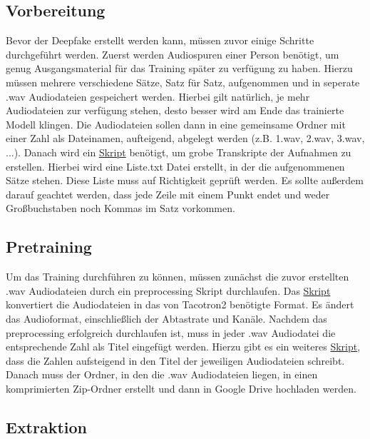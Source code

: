 \subsection{Vorbereitung}
Bevor der Deepfake erstellt werden kann, müssen zuvor einige Schritte durchgeführt werden. Zuerst werden Audiospuren einer Person benötigt, um genug Ausgangsmaterial für das Training später zu verfügung zu haben. Hierzu müssen mehrere verschiedene Sätze, Satz für Satz, aufgenommen und in seperate .wav Audiodateien gespeichert werden. Hierbei gilt natürlich, je mehr Audiodateien zur verfügung stehen, desto besser wird am Ende das trainierte Modell klingen. Die Audiodateien sollen dann in eine gemeinsame Ordner mit einer Zahl als Dateinamen, aufteigend, abgelegt werden (z.B. 1.wav, 2.wav, 3.wav, ...).\newline
Danach wird ein \href{https://github.com/rasmurtech/Tacotron2-Wav2Vec-Transcription/blob/main/transcribe_wav2vec.py}{Skript} benötigt, um grobe Transkripte der Aufnahmen zu erstellen. Hierbei wird eine Liste.txt Datei erstellt, in der die aufgenommenen Sätze stehen. Diese Liste muss auf Richtigkeit geprüft werden. Es sollte außerdem darauf geachtet werden, dass jede Zeile mit einem Punkt endet und weder Großbuchstaben noch Kommas im Satz vorkommen.\newline
\subsection{Pretraining}
Um das Training durchführen zu können, müssen zunächst die zuvor erstellten .wav Audiodateien durch ein preprocessing Skript durchlaufen. Das \href{https://github.com/rasmurtech/Tacotron-2-Audio-Preprocessor/blob/main/tacotron2_preprocessor_wav_files.py}{Skript} konvertiert die Audiodateien in das von Tacotron2 benötigte Format. Es ändert das Audioformat, einschließlich der Abtastrate und Kanäle.\newline
Nachdem das preprocessing erfolgreich durchlaufen ist, muss in jeder .wav Audiodatei die entsprechende Zahl als Titel eingefügt werden. Hierzu gibt es ein weiteres \href{https://github.com/rasmurtech/Audio-Metadata-Updater/blob/main/audio_metadata_updater.py}{Skript}, dass die Zahlen aufsteigend in den Titel der jeweiligen Audiodateien schreibt.\newline
Danach muss der Ordner, in den die .wav Audiodateien liegen, in einen komprimierten Zip-Ordner erstellt und dann in Google Drive hochladen werden.
\subsection{Extraktion}
